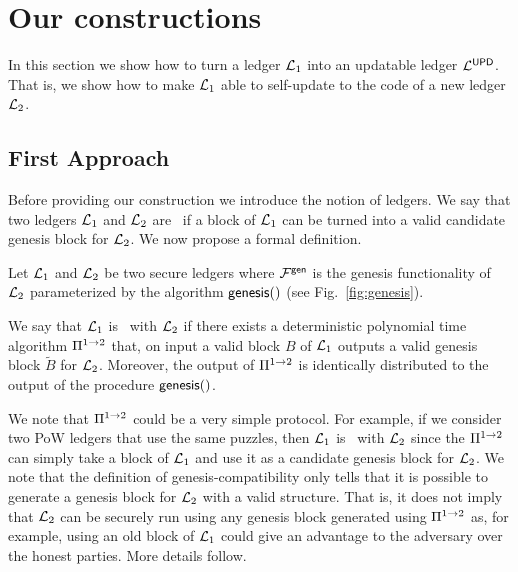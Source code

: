 \section{Our constructions}
In this section we show how to turn a ledger $\mathcal{L}_1$ into an updatable ledger $\mathcal{L}^\mathsf{UPD}$.
That is, we show how to make $\mathcal{L}_1$ able to self-update to the code of a new ledger $\mathcal{L}_2$.



\subsection{First Approach}\label{se:first}
Before providing our construction we introduce the notion of \emph{\gencompatible} ledgers. We say that
two ledgers $\mathcal{L}_1$ and $\mathcal{L}_2$ are \gencompatible\ if a block of 
$\mathcal{L}_1$ can be turned into a valid candidate genesis block for $\mathcal{L}_2$. We now propose a formal definition.


\begin{definition}
Let $\mathcal{L}_1$ and $\mathcal{L}_2$ be two secure ledgers where $\mathcal{F}^\mathsf{gen}$ is the genesis functionality 
of $\mathcal{L}_2$ parameterized by the algorithm $\mathsf{genesis}()$ (see Fig.~\ref{fig:genesis}).

We say that $\mathcal{L}_1$ is \gencompatible\ with $\mathcal{L}_2$ if there exists a deterministic polynomial time
algorithm $\Pi^{1\rightarrow 2}$ that, on input a valid block $B$ of $\mathcal{L}_1$ 
outputs a valid genesis block $\tilde B$ for $\mathcal{L}_2$. Moreover, the output of $\Pi^{1\rightarrow 2}$ is identically distributed to the output of the procedure $\mathsf{genesis}()$.
\end{definition} 



We note that $\Pi^{1\rightarrow 2}$ could be a very simple protocol. For example, if we consider two PoW ledgers 
that use the same puzzles, then $\mathcal{L}_1$ is 
\gencompatible\ with $\mathcal{L}_2$ since the $\Pi^{1\rightarrow 2}$ can simply take a block of $\mathcal{L}_1$ and use it as
a candidate genesis block for $\mathcal{L}_2$.
We note that the definition of genesis-compatibility only tells that it is possible to generate a genesis block for $\mathcal{L}_2$ with a valid structure. That is, it does not imply that $\mathcal{L}_2$ can be securely run using any genesis block generated using $\Pi^{1\rightarrow 2}$ as, for example, using an old block of $\mathcal{L}_1$ could give an advantage to the adversary over the honest parties.  More details follow.

